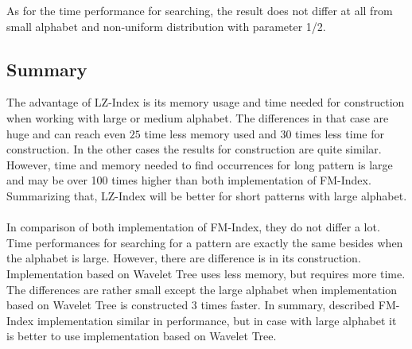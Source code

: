 As for the time performance for searching, the result does not differ at all from small alphabet and non-uniform distribution with parameter 1/2.

\subsection{Summary}
The advantage of LZ-Index is its memory usage and time needed for construction when working with large or medium alphabet. The differences in that case are huge and can reach even $25$ time less memory used and $30$ times less time for construction. In the other cases the results for construction are quite similar. However, time and memory needed to find occurrences for long pattern is large and may be over 100 times higher than both implementation of FM-Index. Summarizing that, LZ-Index will be better for short patterns with large alphabet.
\\
\\
In comparison of both implementation of FM-Index, they do not differ a lot. Time performances for searching for a pattern are exactly the same besides when the alphabet is large. However, there are difference is in its construction. Implementation based on Wavelet Tree uses less memory, but requires more time. The differences are rather small except the large alphabet when implementation based on Wavelet Tree is constructed $3$ times faster. In summary, described FM-Index implementation similar in performance, but in case with large alphabet it is better to use implementation based on Wavelet Tree.